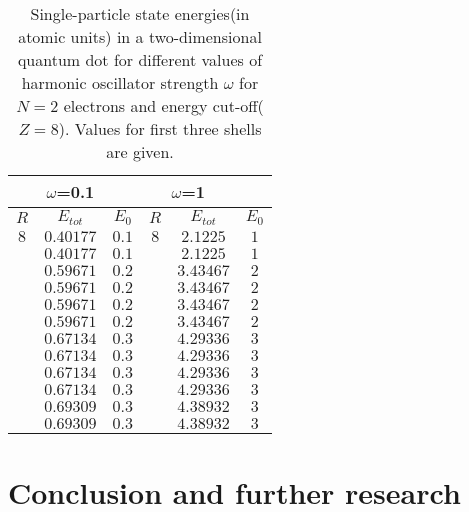 \documentclass[10pt]{article}
\begin{document}
\begin{table}[h!]
  \caption{ Single-particle state energies(in atomic units) in a two-dimensional quantum dot for different values of harmonic oscillator strength $\omega$ for $N=2$ electrons and energy cut-off($Z=8$). Values for first three shells are given.}
  \label{tab:results1}
  \begin{center}
    \begin{tabular}{ccc|ccc}
     \multirow{2}{*}{} &
      \multicolumn{1}{c}{$\omega$=0.1} &
      \multicolumn{4}{c}{$\omega$=1} \\
    \hline
    \hline
		$R$ & $E_{tot}$ & $E_0$ & $R$ & $E_{tot}$ & $E_0$  \\
    \hline
	   $	8 $  & $0.40177 $ & $  0.1$ &$	8 $  & $2.1225  $ & $  1$  \\
	   $	  $  & $0.40177 $ & $  0.1$ &$	  $  & $2.1225  $ & $  1$  \\
	   $	  $  & $0.59671 $ & $  0.2$ &$	  $  & $3.43467 $ & $  2$  \\
	   $	  $  & $0.59671 $ & $  0.2$ &$	  $  & $3.43467 $ & $  2$  \\
   	   $	  $  & $0.59671 $ & $  0.2$ &$	  $  & $3.43467 $ & $  2$  \\
   	   $	  $  & $0.59671 $ & $  0.2$ &$	  $  & $3.43467 $ & $  2$  \\
       $      $  & $0.67134 $ & $  0.3$ &$    $  & $4.29336 $ & $  3$  \\
       $      $  & $0.67134 $ & $  0.3$ &$    $  & $4.29336 $ & $  3$  \\
       $      $  & $0.67134 $ & $  0.3$ &$    $  & $4.29336 $ & $  3$  \\
       $      $  & $0.67134 $ & $  0.3$ &$    $  & $4.29336 $ & $  3$  \\
				 & $0.69309 $ & $  0.3$ &        & $4.38932 $ & $  3$  \\
				 & $0.69309 $ & $  0.3$ &        & $4.38932 $ & $  3$  \\
	\end{tabular}                                                                                  
  \end{center}
\end{table}


\section{Conclusion and further research}\label{conc}
\end{document}
